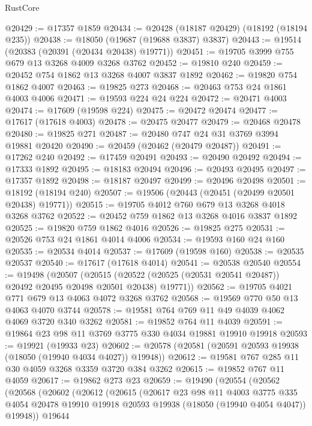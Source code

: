 \begin{lexlean}{RustCore}
\begin{coremodule}
@20429 := @17357 @1859
@20434 := @20428 (@18187 @20429) (@18192 (@18194 @235))
@20438 := @18050 (@19687 (@19688 @3837) @3837)
@20443 := @19514 (@20383 (@20391 (@20434 @20438) @19771))
@20451 := @19705 @3999 @755 @679 @13 @3268 @4009 @3268 @3762
@20452 := @19810 @240
@20459 := @20452 @754 @1862 @13 @3268 @4007 @3837 @1892
@20462 := @19820 @754 @1862 @4007
@20463 := @19825 @273
@20468 := @20463 @753 @24 @1861 @4003 @4006
@20471 := @19593 @224 @24 @224
@20472 := @20471 @4003
@20474 := @17609 (@19598 @224)
@20475 := @20472 @20474
@20477 := @17617 (@17618 @4003)
@20478 := @20475 @20477
@20479 := @20468 @20478
@20480 := @19825 @271
@20487 := @20480 @747 @24 @31 @3769 @3994 @19881 @20420
@20490 := @20459 (@20462 (@20479 @20487))
@20491 := @17262 @240
@20492 := @17459 @20491
@20493 := @20490 @20492
@20494 := @17333 @1892
@20495 := @18183 @20494
@20496 := @20493 @20495
@20497 := @17357 @1892
@20498 := @18187 @20497
@20499 := @20496 @20498
@20501 := @18192 (@18194 @240)
@20507 := @19506 (@20443 (@20451 (@20499 @20501 @20438) @19771))
@20515 := @19705 @4012 @760 @679 @13 @3268 @4018 @3268 @3762
@20522 := @20452 @759 @1862 @13 @3268 @4016 @3837 @1892
@20525 := @19820 @759 @1862 @4016
@20526 := @19825 @275
@20531 := @20526 @753 @24 @1861 @4014 @4006
@20534 := @19593 @160 @24 @160
@20535 := @20534 @4014
@20537 := @17609 (@19598 @160)
@20538 := @20535 @20537
@20540 := @17617 (@17618 @4014)
@20541 := @20538 @20540
@20554 := @19498
    (@20507
      (@20515 (@20522 (@20525 (@20531 @20541 @20487)) @20492 @20495 @20498 @20501 @20438) @19771))
@20562 := @19705 @4021 @771 @679 @13 @4063 @4072 @3268 @3762
@20568 := @19569 @770 @50 @13 @4063 @4070 @3744
@20578 := @19581 @764 @769 @11 @49 @4039 @4062 @4069 @3720 @340 @3262
@20581 := @19852 @764 @11 @4039
@20591 := @19864 @23 @98 @11 @3769 @3775 @330 @4034 @19881 @19910 @19918
@20593 := @19921 (@19933 @23)
@20602 := @20578 (@20581 (@20591 @20593 @19938 (@18050 (@19940 @4034 @4027)) @19948))
@20612 := @19581 @767 @285 @11 @30 @4059 @3268 @3359 @3720 @384 @3262
@20615 := @19852 @767 @11 @4059
@20617 := @19862 @273 @23
@20659 := @19490
    (@20554
      (@20562
        (@20568
          (@20602
            (@20612
              (@20615
                (@20617
                  @23
                  @98
                  @11
                  @4003
                  @3775
                  @335
                  @4054
                  @20478
                  @19910
                  @19918
                  @20593
                  @19938
                  (@18050 (@19940 @4054 @4047))
                  @19948))
              @19644

\end{coremodule}
\end{lexlean}
